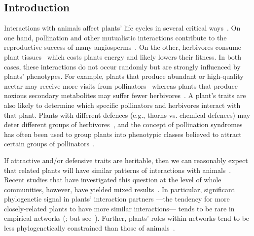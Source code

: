 \documentclass[12pt]{article}
\begin{document}
\begin{spacing}{1.5}

\section*{Introduction}
\linenumbers

  Interactions with animals affect plants' life cycles in several critical
  ways~\citep{Mayr2001,Sauve2015}. On one hand,
  pollination and other mutualistic interactions contribute
  to the reproductive success of many angiosperms~\citep{Ollerton2011}. 
  On the other, herbivores consume plant tissues~\citep{McCall2006} which
  costs plants energy and likely lowers their fitness.
  In both cases, these interactions do not occur randomly but
  are strongly influenced by plants' phenotypes. For example, plants that produce
  abundant or high-quality nectar may receive more visits from
  pollinators~\citep{Robertson1999} whereas plants that produce noxious secondary metabolites
  may suffer fewer herbivores~\citep{Johnson2014}. A plant's traits are also 
  likely to determine which specific pollinators and herbivores interact with that plant.
  Plants with different defences (e.g., thorns vs. chemical defences) may deter 
  different groups of herbivores~\citep{Ehrlich1964,Johnson2014}, and the concept
  of pollination syndromes has often been used to group plants into phenotypic
  classes believed to attract certain groups of pollinators~\citep{Waser1996,Fenster2004,Ollerton2009}.


  If attractive and/or defensive traits are heritable,
  then we can reasonably expect that related plants will have similar 
  patterns of interactions with animals~\citep{Schemske1999}.
  Recent studies that have investigated this question at the level of whole
  communities, however, have yielded mixed results~\citep{Rezende2007a,Gomez2010,Rohr2014a,Fontaine2015,Lind2015}.
  In particular, significant phylogenetic signal in plants' interaction partners
  ---the tendency for more closely-related plants to have more similar interactions---
  tends to be rare in empirical networks (\citealp{Rezende2007a,Lind2015}; but see~\citealp{Elias2013,Fontaine2015}).
  Further, plants' roles within networks tend to be less phylogenetically constrained than those of 
  animals~\citep{Rezende2007a,Chamberlain2014,Rohr2014,Vamosi2014,Lind2015}. 



\end{spacing}
\end{document}
